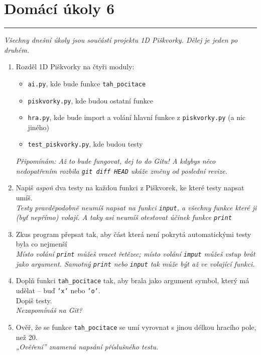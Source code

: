 \documentclass[a4paper,10pt]{article}
\newcommand\plsetno{6}
\newcommand\startsection[1]{
     \vspace{0.2ex}
    \hrule
    {\fontspec{Oxygen} \tiny
     \vspace{-1ex}
     \emph{#1}
     \vspace{-1.5em}
    }
}
\begin{document}
\section*{Domácí úkoly \plsetno}

\startsection{Všechny dnešní úkoly jsou součástí projektu 1D Piškvorky. Dělej je jeden po druhém.}

\begin{enumerate}
\item Rozděl 1D Piškvorky na čtyři moduly:
    \begin{itemize}
        \item \texttt{ai.py}, kde bude funkce \texttt{tah\_pocitace}
        \item \texttt{piskvorky.py}, kde budou ostatní funkce
        \item \texttt{hra.py}, kde bude import a volání hlavní funkce z \texttt{piskvorky.py} (a nic jiného)
        \item \texttt{test\_piskvorky.py}, kde budou testy
    \end{itemize}
    \emph{\small Připomínám: Až to bude fungovat, dej to do Gitu! A kdybys něco nedopatřením rozbila \texttt{git diff HEAD} ukáže změny od poslední revize.}

\item Napiš \emph{aspoň} dva testy na každou funkci z Piškvorek, ke které testy napsat umíš.
    \\\emph{\small Testy pravděpodobně neumíš napsat na funkci \texttt{input}, a všechny funkce které ji (byť nepřímo) volají.
            A taky asi neumíš otestovat účinek funkce \texttt{print}}

\item Zkus program přepsat tak, aby část která není pokrytá automatickými testy byla co nejmenší
    \\\emph{\small Místo volání \texttt{print} můžeš vracet řetězec;
            místo volání \texttt{imput} můžeš vstup brát jako argument.
            Samotný \texttt{print} nebo \texttt{input} tak může být až ve volající funkci.}

\item Doplň funkci \texttt{tah\_pocitace} tak, aby brala jako argument symbol, který má udělat – buď \texttt{'x'} nebo \texttt{'o'}.
    \\Dopiš testy.
    \\\emph{\small Nezapomínáš na Git?}

\item Ověř, že se funkce \texttt{tah\_pocitace} se umí vyrovnat s jinou délkou hracího pole, než 20.
    \\\emph{\small „Ověření” znamená napsání příslušného testu.}


\end{enumerate}
\end{document}

